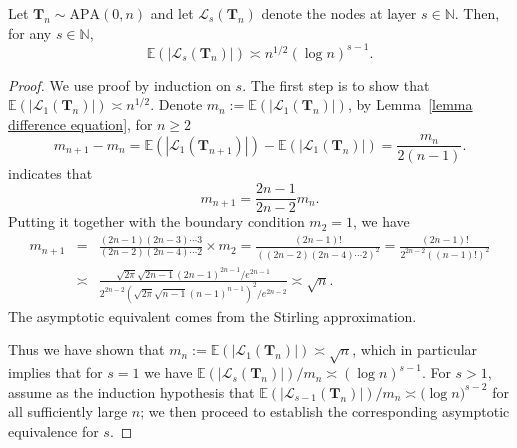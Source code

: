 \documentclass[twoside,11pt]{article}
\theoremstyle{remark}
\begin{document}
\begin{lemma}
\label{lemma layer size}
Let $\boldsymbol{T}_n \sim \mathrm{APA}(0, n)$ and let $\mathcal{L}_s(\boldsymbol{T}_n)$ denote the nodes at layer $s \in \mathbb{N}$. Then, for any $s\in \mathbb{N}$,
%
\begin{equation*}    \mathbb{E}\left(\left|\mathcal{L}_s\left(\boldsymbol{T}_n\right)\right|\right) \asymp  n^{1/2}\left(\log n\right)^{s-1}.
\end{equation*}
%
\end{lemma}
\begin{proof}
We use proof by induction on $s$. The first step is to show that $\mathbb{E}\left(\left|\mathcal{L}_1\left(\boldsymbol{T}_n\right)\right|\right)\asymp n^{1/2}$.
Denote $m_n:=\mathbb{E}\left(\left|\mathcal{L}_1\left(\boldsymbol{T}_n\right)\right|\right)$, by Lemma~\ref{lemma difference equation}, for $n\geq 2$
%
\begin{equation*}
    m_{n+1}-m_n=\mathbb{E}\left(\left|\mathcal{L}_1\left(\boldsymbol{T}_{n+1}\right)\right|\right)-\mathbb{E}\left(\left|\mathcal{L}_1\left(\boldsymbol{T}_n\right)\right|\right)=\frac{m_n}{2\left(n-1\right)}.
\end{equation*}
%
indicates that
%
\begin{equation}
\label{lemma 5 eqn 1}
   m_{n+1}=\frac{2n-1}{2n-2}m_{n}. 
\end{equation}
%
Putting it together with the boundary condition $m_2=1$, we have 
%
\begin{eqnarray*}
m_{n+1}&=&\frac{\left(2n-1\right)\left(2n-3\right)\cdots 3}{\left(2n-2\right)\left(2n-4\right)\cdots 2}\times m_2=\frac{\left(2n-1\right)!}{\left(\left(2n-2\right)\left(2n-4\right)\cdots 2\right)^2}=\frac{\left(2n-1\right)!}{2^{2n-2}\left(\left(n-1\right)!\right)^2}\\
& \asymp &\frac{\sqrt{2\pi}\sqrt{2n-1}\left(2n-1\right)^{2n-1}/e^{2n-1}}{2^{2n-2}\left(\sqrt{2\pi}\sqrt{n-1}\left(n-1\right)^{n-1}\right)^2/e^{2n-2}}\asymp \sqrt{n}.
\end{eqnarray*}
%
The asymptotic equivalent comes from the Stirling approximation.


Thus we have shown that $m_n := \mathbb{E}\left(\left|\mathcal{L}_1\left(\boldsymbol{T}_n\right)\right|\right) \asymp \sqrt{n}$, which in particular implies  that for $s=1$ we have $\mathbb{E}\left(\left|\mathcal{L}_{s}\left(\boldsymbol{T}_n\right)\right|\right)/m_n \asymp \left(\log n\right)^{s-1}$. For $s > 1$, assume as the induction hypothesis that $\mathbb{E}(|\mathcal{L}_{s-1}(\boldsymbol{T}_n)|)/m_n \asymp \bigl(\log n\bigr)^{s-2}$ for all sufficiently large $n$; we then proceed to establish the corresponding asymptotic equivalence for $s$.


\end{proof}
\end{document}
